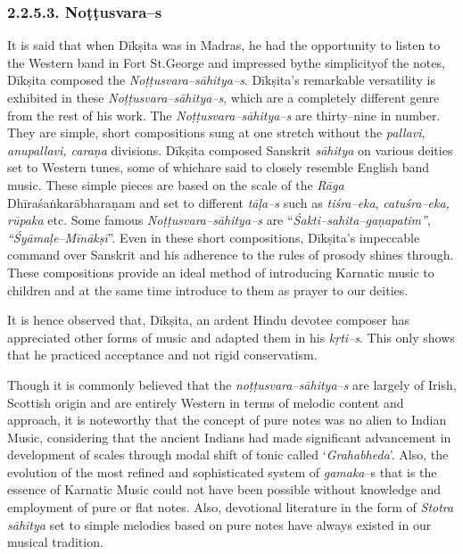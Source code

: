 \subsubsection*{2.2.5.3. Noṭṭusvara–s}

It is said that when Dīkṣita was in Madras, he had the opportunity to listen to the Western band in Fort St.George and impressed bythe simplicityof the notes, Dīkṣita composed the \textit{Noṭṭusvara–sāhitya–s}. Dīkṣita's remarkable versatility is exhibited in these \textit{Noṭṭusvara–sāhitya–s}, which are a completely different genre from the rest of his work. The \textit{Noṭṭusvara–sāhitya–s} are thirty–nine in number. They are simple, short compositions sung at one stretch without the \textit{pallavi}, \textit{anupallavi, caraṇa} divisions. Dīkṣita composed Sanskrit \textit{sāhitya} on various deities set to Western tunes, some of whichare said to closely resemble English band music. These simple pieces are based on the scale of the \textit{Rāga} Dhīraśaṅkarābharaṇam and set to different \textit{tāḷa–s} such as \textit{tiśra–eka}, \textit{catuśra–eka, rūpaka} etc. Some famous \textit{Noṭṭusvara–sāhitya–s} are “\textit{Śakti–sahita–gaṇapatim”}, \textit{“Śyāmaḷe–Mīnākṣī}”. Even in these short compositions, Dīkṣita's impeccable command over Sanskrit and his adherence to the rules of prosody shines through. These compositions provide an ideal method of introducing Karnatic music to children and at the same time introduce to them as prayer to our deities.

It is hence observed that, Dīkṣita, an ardent Hindu devotee composer has appreciated other forms of music and adapted them in his \textit{kṛti–s}. This only shows that he practiced acceptance and not rigid conservatism.

Though it is commonly believed that the \textit{noṭṭusvara–sāhitya–s} are largely of Irish, Scottish origin and are entirely Western in terms of melodic content and approach, it is noteworthy that the concept of pure notes was no alien to Indian Music, considering that the ancient Indians had made significant advancement in development of scales through modal shift of tonic called ‘\textit{Grahabheda}’. Also, the evolution of the most refined and sophisticated system of \textit{gamaka}–s that is the essence of Karnatic Music could not have been possible without knowledge and employment of pure or flat notes. Also, devotional literature in the form of \textit{Stotra sāhitya} set to simple melodies based on pure notes have always existed in our musical tradition.

